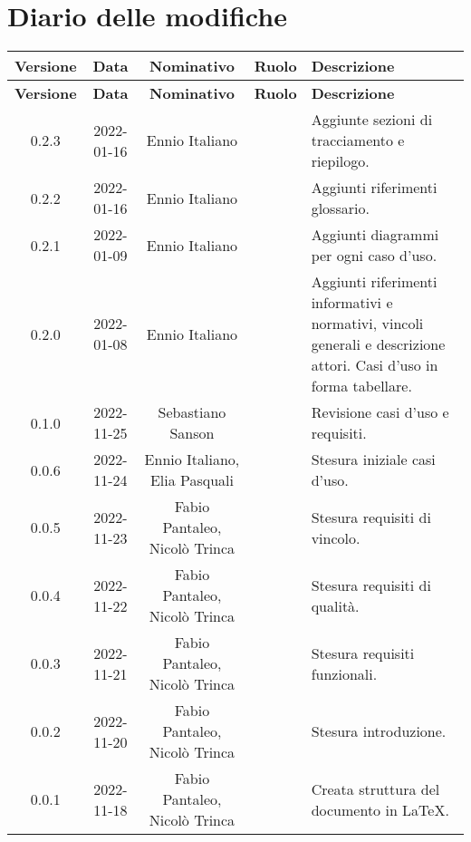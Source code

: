 \section*{Diario delle modifiche}

	\renewcommand{\arraystretch}{1.5}
	\begin{longtable}{ c  c  c  c  p{10em}}
		\rowcolorhead
		\textbf{\color{white}Versione} &
		\textbf{\color{white}Data} &
		\textbf{\color{white}Nominativo} &
		\textbf{\color{white}Ruolo} &
		\textbf{\color{white}Descrizione} \\
		\hline
		\endfirsthead

		\hline
		\rowcolorhead
		\textbf{\color{white}Versione} &
		\textbf{\color{white}Data} &
		\textbf{\color{white}Nominativo} &
		\textbf{\color{white}Ruolo} &
		\textbf{\color{white}Descrizione} \\
		\hline
		\endhead

		\endfoot
		\endlastfoot

		0.2.3 &
		2022-01-16 &
		Ennio Italiano &
		&
		Aggiunte sezioni di tracciamento e riepilogo. \\
		\hline

		0.2.2 &
		2022-01-16 &
		Ennio Italiano &
		&
		Aggiunti riferimenti glossario. \\
		\hline

		0.2.1 &
		2022-01-09 &
		Ennio Italiano &
		&
		Aggiunti diagrammi per ogni caso d'uso. \\
		\hline

		0.2.0 &
		2022-01-08 &
		Ennio Italiano &
		&
		Aggiunti riferimenti informativi e normativi, vincoli generali e descrizione attori. Casi d'uso in forma tabellare. \\
		\hline

		0.1.0 &
		2022-11-25 &
		Sebastiano Sanson &
		&
		Revisione casi d'uso e requisiti. \\
		\hline

		0.0.6 &
		2022-11-24 &
		Ennio Italiano, Elia Pasquali &
		&
		Stesura iniziale casi d'uso. \\
		\hline

		0.0.5 &
		2022-11-23 &
		Fabio Pantaleo, Nicolò Trinca &
		&
		Stesura requisiti di vincolo. \\
		\hline

		0.0.4 &
		2022-11-22 &
		Fabio Pantaleo, Nicolò Trinca &
		&
		Stesura requisiti di qualità. \\
		\hline

		0.0.3 &
		2022-11-21 &
		Fabio Pantaleo, Nicolò Trinca &
		&
		Stesura requisiti funzionali. \\
		\hline

		0.0.2 &
		2022-11-20 &
		Fabio Pantaleo, Nicolò Trinca &
		&
		Stesura introduzione. \\
		\hline

		0.0.1 &
		2022-11-18 &
		Fabio Pantaleo, Nicolò Trinca &
		&
		Creata struttura del documento in \LaTeX{}. \\
		\hline

	\end{longtable}
\renewcommand{\arraystretch}{1}